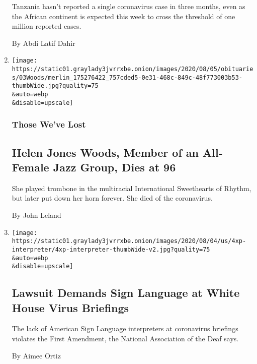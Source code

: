 \begin{enumerate}
  Tanzania hasn't reported a single coronavirus case in three months,
  even as the African continent is expected this week to cross the
  threshold of one million reported cases.

  By Abdi Latif Dahir
\item
  \href{/2020/08/04/obituaries/Helen-Woods-dead-coronavirus.html}{}

  \texttt{[image: https://static01.graylady3jvrrxbe.onion/images/2020/08/05/obituaries/03Woods/merlin\_175276422\_757cded5-0e31-468c-849c-48f773003b53-thumbWide.jpg?quality=75\\\&auto=webp\\\&disable=upscale]}

  \hypertarget{those-weve-lost}{%
  \subsubsection{Those We've Lost}\label{those-weve-lost}}

  \hypertarget{helen-jones-woods-member-of-an-all-female-jazz-group-dies-at-96}{%
  \subsection{Helen Jones Woods, Member of an All-Female Jazz Group,
  Dies at
  96}\label{helen-jones-woods-member-of-an-all-female-jazz-group-dies-at-96}}

  She played trombone in the multiracial International Sweethearts of
  Rhythm, but later put down her horn forever. She died of the
  coronavirus.

  By John Leland
\item
  \href{/2020/08/04/us/politics/asl-interpreter-lawsuit-coronavirus-trump.html}{}

  \texttt{[image: https://static01.graylady3jvrrxbe.onion/images/2020/08/04/us/4xp-interpreter/4xp-interpreter-thumbWide-v2.jpg?quality=75\\\&auto=webp\\\&disable=upscale]}

  \hypertarget{lawsuit-demands-sign-language-at-white-house-virus-briefings}{%
  \subsection{Lawsuit Demands Sign Language at White House Virus
  Briefings}\label{lawsuit-demands-sign-language-at-white-house-virus-briefings}}

  The lack of American Sign Language interpreters at coronavirus
  briefings violates the First Amendment, the National Association of
  the Deaf says.

  By Aimee Ortiz
\end{enumerate}

